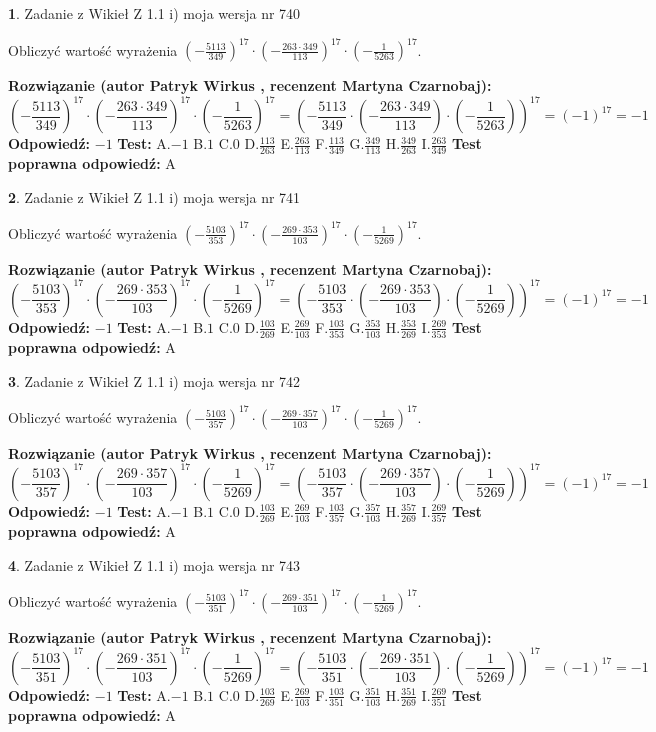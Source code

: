 \documentclass[12pt, a4paper]{article}
\theoremstyle{definition} %
\newtheorem{zad}{}
\newcommand{\zadStart}[1]{\begin{zad}#1\newline}
\newcommand{\zadStop}{\end{zad}}
\newcommand{\rozwStart}[2]{\noindent \textbf{Rozwiązanie (autor #1 , recenzent #2): }\newline}
\newcommand{\rozwStop}{\newline}
\newcommand{\odpStart}{\noindent \textbf{Odpowiedź:}\newline}
\newcommand{\odpStop}{\newline}
\newcommand{\testStart}{\noindent \textbf{Test:}\newline}
\newcommand{\testStop}{\newline}
\newcommand{\kluczStart}{\noindent \textbf{Test poprawna odpowiedź:}\newline}
\newcommand{\kluczStop}{\newline}
\begin{document}
\zadStart{Zadanie z Wikieł Z 1.1 i) moja wersja nr 740}

Obliczyć wartość wyrażenia $(-\frac{5113}{349})^{17} \cdot (-\frac{263 \cdot 349}{113})^{17} \cdot (-\frac{1}{5263})^{17}$.
\zadStop
\rozwStart{Patryk Wirkus}{Martyna Czarnobaj}
$$(-\frac{5113}{349})^{17} \cdot (-\frac{263 \cdot 349}{113})^{17} \cdot (-\frac{1}{5263})^{17} = (-\frac{5113}{349} \cdot (-\frac{263 \cdot 349}{113}) \cdot (-\frac{1}{5263}))^{17} = (-1)^{17} = -1$$
\rozwStop
\odpStart
$-1$
\odpStop
\testStart
A.$-1$ B.$1$ C.$0$ D.$\frac{113}{263}$ E.$\frac{263}{113}$
F.$\frac{113}{349}$ G.$\frac{349}{113}$
H.$\frac{349}{263}$
I.$\frac{263}{349}$
\testStop
\kluczStart
A
\kluczStop



\zadStart{Zadanie z Wikieł Z 1.1 i) moja wersja nr 741}

Obliczyć wartość wyrażenia $(-\frac{5103}{353})^{17} \cdot (-\frac{269 \cdot 353}{103})^{17} \cdot (-\frac{1}{5269})^{17}$.
\zadStop
\rozwStart{Patryk Wirkus}{Martyna Czarnobaj}
$$(-\frac{5103}{353})^{17} \cdot (-\frac{269 \cdot 353}{103})^{17} \cdot (-\frac{1}{5269})^{17} = (-\frac{5103}{353} \cdot (-\frac{269 \cdot 353}{103}) \cdot (-\frac{1}{5269}))^{17} = (-1)^{17} = -1$$
\rozwStop
\odpStart
$-1$
\odpStop
\testStart
A.$-1$ B.$1$ C.$0$ D.$\frac{103}{269}$ E.$\frac{269}{103}$
F.$\frac{103}{353}$ G.$\frac{353}{103}$
H.$\frac{353}{269}$
I.$\frac{269}{353}$
\testStop
\kluczStart
A
\kluczStop



\zadStart{Zadanie z Wikieł Z 1.1 i) moja wersja nr 742}

Obliczyć wartość wyrażenia $(-\frac{5103}{357})^{17} \cdot (-\frac{269 \cdot 357}{103})^{17} \cdot (-\frac{1}{5269})^{17}$.
\zadStop
\rozwStart{Patryk Wirkus}{Martyna Czarnobaj}
$$(-\frac{5103}{357})^{17} \cdot (-\frac{269 \cdot 357}{103})^{17} \cdot (-\frac{1}{5269})^{17} = (-\frac{5103}{357} \cdot (-\frac{269 \cdot 357}{103}) \cdot (-\frac{1}{5269}))^{17} = (-1)^{17} = -1$$
\rozwStop
\odpStart
$-1$
\odpStop
\testStart
A.$-1$ B.$1$ C.$0$ D.$\frac{103}{269}$ E.$\frac{269}{103}$
F.$\frac{103}{357}$ G.$\frac{357}{103}$
H.$\frac{357}{269}$
I.$\frac{269}{357}$
\testStop
\kluczStart
A
\kluczStop



\zadStart{Zadanie z Wikieł Z 1.1 i) moja wersja nr 743}

Obliczyć wartość wyrażenia $(-\frac{5103}{351})^{17} \cdot (-\frac{269 \cdot 351}{103})^{17} \cdot (-\frac{1}{5269})^{17}$.
\zadStop
\rozwStart{Patryk Wirkus}{Martyna Czarnobaj}
$$(-\frac{5103}{351})^{17} \cdot (-\frac{269 \cdot 351}{103})^{17} \cdot (-\frac{1}{5269})^{17} = (-\frac{5103}{351} \cdot (-\frac{269 \cdot 351}{103}) \cdot (-\frac{1}{5269}))^{17} = (-1)^{17} = -1$$
\rozwStop
\odpStart
$-1$
\odpStop
\testStart
A.$-1$ B.$1$ C.$0$ D.$\frac{103}{269}$ E.$\frac{269}{103}$
F.$\frac{103}{351}$ G.$\frac{351}{103}$
H.$\frac{351}{269}$
I.$\frac{269}{351}$
\testStop
\kluczStart
A
\kluczStop
\end{document}
